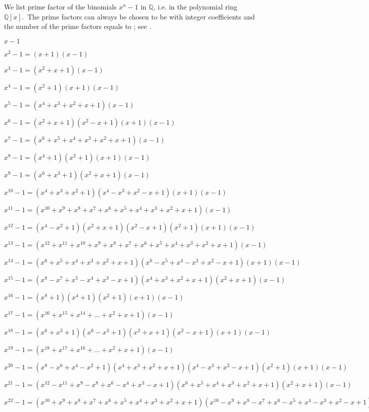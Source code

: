 \documentclass[12pt]{article}
\theoremstyle{definition}
\begin{document}
We list prime factor  of the binomials 
$x^n\!-\!1$ in $\mathbb{Q}$, i.e. in the polynomial ring $\mathbb{Q}[x]$.\, The prime factors can always be chosen to be with integer coefficients and the number of the prime factors equals to ; see .

$x-1$

$x^2\!-\!1 = (x+1)(x-1)$

$x^3\!-\!1 = (x^2+x+1)(x-1)$

$x^4\!-\!1 = (x^2+1)(x+1)(x-1)$

$x^5\!-\!1 = (x^4+x^3+x^2+x+1)(x-1)$

$x^6\!-\!1 = (x^2+x+1)(x^2-x+1)(x+1)(x-1)$

$x^7\!-\!1 = (x^6+x^5+x^4+x^3+x^2+x+1)(x-1)$

$x^8\!-\!1 = (x^4+1)(x^2+1)(x+1)(x-1)$

$x^9\!-\!1 = (x^6+x^3+1)(x^2+x+1)(x-1)$

$x^{10}\!-\!1 = (x^4+x^3+x^2+1)(x^4-x^3+x^2-x+1)(x+1)(x-1)$

$x^{11}\!-\!1 = (x^{10}\!+\!x^9\!+\!x^8\!+\!x^7\!+\!x^6\!+\!x^5\!+\!x^4\!+\!x^3\!+\!x^2\!+\!x\!+\!1)(x-1)$

$x^{12}\!-\!1 = (x^4-x^2+1)(x^2+x+1)(x^2-x+1)(x^2+1)(x+1)(x-1)$

$x^{13}\!-\!1 =(x^{12}\!+\!x^{11}\!+\!x^{10}\!+\!x^9\!+\!x^8\!+\!x^7\!+
\!x^6\!+\!x^5\!+\!x^4\!+\!x^3\!+\!x^2\!+\!x\!+\!1)(x\!-\!1)$

$x^{14}\!-\!1 = (x^6+x^5+x^4+x^3+x^2+x+1)(x^6-x^5+x^4-x^3+x^2-x+1)(x+1)(x-1)$

$x^{15}\!-\!1 = (x^8-x^7+x^5-x^4+x^3-x+1)(x^4+x^3+x^2+x+1)(x^2+x+1)(x-1)$

$x^{16}\!-\!1 = (x^8+1)(x^4+1)(x^2+1)(x+1)(x-1)$

$x^{17}\!-\!1 = (x^{16}\!+\!x^{15}\!+\!x^{14}\!+\ldots+\!x^2\!+\!x\!+\!1)(x\!-\!1)$

$x^{18}\!-\!1 = (x^6+x^3+1)(x^6-x^3+1)(x^2+x+1)(x^2-x+1)(x+1)(x-1)$

$x^{19}\!-\!1 = (x^{18}\!+\!x^{17}\!+\!x^{16}\!+\ldots+\!x^2\!+\!x\!+\!1)(x-1)$

$x^{20}\!-\!1 = (x^8-x^6+x^4-x^2+1)(x^4+x^3+x^2+x+1)(x^4-x^3+x^2-x+1)(x^2+1)(x+1)(x-1)$

$x^{21}\!-\!1 = (x^{12}\!-\!x^{11}\!+\!x^9\!-\!x^8\!+\!x^6\!-\!x^4\!+\!x^3\!-\!x\!+\!1)(x^6\!+\!x^5\!+\!x^4\!+\!x^3\!+\!x^2\!+\!x\!+\!1)(x^2\!+\!x\!+\!1)
(x\!-\!1)$

$x^{22}\!-\!1 = (x^{10}\!+\!x^9\!+\!x^8\!+\!x^7\!+\!x^6\!+\!x^5\!+\!x^4\!+\!x^3\!+\!x^2\!+\!x\!+\!1)(x^{10}\!-\!x^9\!+\!x^8\!-\!x^7\!+\!x^6\!-\!x^5\!+\!x^4\!-\!x^3\!+\!x^2\!-\!x\!+\!1)(x\!+\!1)(x\!-\!1)$
\end{document}
